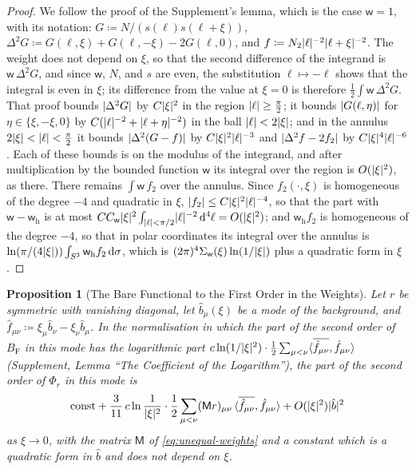 \documentclass[11pt]{preprint}
\newcommand{\dd}{\mathrm{d}}
\DeclarePairedDelimiter{\abs}{\lvert}{\rvert}
\numberwithin{equation}{section}
\newtheorem{proposition}[theorem]{Proposition}
\theoremstyle{definition}
\theoremstyle{remark}
\theoremstyle{plain}
\begin{document}
\begin{proof}
We follow the proof of the Supplement's lemma, which is the case $\mathsf w = 1$, with its notation: $G \coloneqq N/(s(\ell)s(\ell + \xi))$, $\Delta^2G \coloneqq G(\ell, \xi) + G(\ell, -\xi) - 2G(\ell, 0)$, and $f \coloneqq N_2\abs\ell^{-2}\abs{\ell + \xi}^{-2}$. The weight does not depend on $\xi$, so that the second difference of the integrand is $\mathsf w\,\Delta^2G$, and since $\mathsf w$, $N$, and $s$ are even, the substitution $\ell \mapsto -\ell$ shows that the integral is even in $\xi$; its difference from the value at $\xi = 0$ is therefore $\frac12\int\mathsf w\,\Delta^2G$. That proof bounds $\abs{\Delta^2G}$ by $C\abs\xi^2$ in the region $\abs\ell \geq \frac\pi2$; it bounds $\abs{G(\ell, \eta)}$ for $\eta \in \{ \xi, -\xi, 0 \}$ by $C(\abs\ell^{-2} + \abs{\ell + \eta}^{-2})$ in the ball $\abs\ell < 2\abs\xi$; and in the annulus $2\abs\xi < \abs\ell < \frac\pi2$ it bounds $\abs{\Delta^2(G - f)}$ by $C\abs\xi^2\abs\ell^{-3}$ and $\abs{\Delta^2f - 2f_2}$ by $C\abs\xi^4\abs\ell^{-6}$. Each of these bounds is on the modulus of the integrand, and after multiplication by the bounded function $\mathsf w$ its integral over the region is $O(\abs\xi^2)$, as there. There remains $\int\mathsf w\,f_2$ over the annulus. Since $f_2(\cdot, \xi)$ is homogeneous of the degree $-4$ and quadratic in $\xi$, $\abs{f_2} \leq C\abs\xi^2\abs\ell^{-4}$, so that the part with $\mathsf w - \mathsf w_{\mathrm h}$ is at most $CC_{\mathsf w}\abs\xi^2\int_{\abs\ell<\pi/2}\abs\ell^{-2}\,\dd^4\ell = O(\abs\xi^2)$; and $\mathsf w_{\mathrm h}f_2$ is homogeneous of the degree $-4$, so that in polar coordinates its integral over the annulus is $\ln(\pi/(4\abs\xi))\int_{S^3}\mathsf w_{\mathrm h}f_2\,\dd\sigma$, which is $(2\pi)^4\Sigma_{\mathsf w}(\xi)\ln(1/\abs\xi)$ plus a quadratic form in $\xi$.
\end{proof}

\begin{proposition}[The Bare Functional to the First Order in the Weights]\label{prop:weighted-bare}
Let $r$ be symmetric with vanishing diagonal, let $\hat b_\mu(\xi)$ be a mode of the background, and $\hat f_{\mu\nu} \coloneqq \xi_\mu\hat b_\nu - \xi_\nu\hat b_\mu$. In the normalisation in which the part of the second order of $B_{\mathrm F}$ in this mode has the logarithmic part $c\ln(1/\abs\xi^2) \cdot \frac12\sum_{\mu<\nu}\langle\overline{\hat f_{\mu\nu}}, \hat f_{\mu\nu}\rangle$ (Supplement, Lemma ``The Coefficient of the Logarithm''), the part of the second order of $\Phi_r$ in this mode is
\begin{equation}\label{eq:weighted-bare}
    \mathrm{const} + \frac{3}{11}\,c\ln\frac{1}{\abs\xi^2} \cdot \frac12\sum_{\mu<\nu}(\mathsf Mr)_{\mu\nu}\,\langle\overline{\hat f_{\mu\nu}}, \hat f_{\mu\nu}\rangle + O(\abs\xi^2)\abs{\hat b}^2
\end{equation}
as $\xi \to 0$, with the matrix $\mathsf M$ of \eqref{eq:unequal-weights} and a constant which is a quadratic form in $\hat b$ and does not depend on $\xi$.
\end{proposition}
\end{document}
